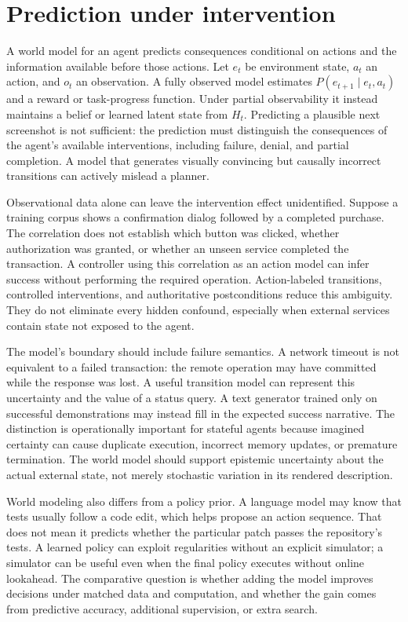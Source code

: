 \section{Prediction under intervention}
\label{sec:C06:intervention}
A world model for an agent predicts consequences conditional on actions and the information available before those actions. Let $e_t$ be environment state, $a_t$ an action, and $o_t$ an observation. A fully observed model estimates $P(e_{t+1}\mid e_t,a_t)$ and a reward or task-progress function. Under partial observability it instead maintains a belief or learned latent state from $H_t$. Predicting a plausible next screenshot is not sufficient: the prediction must distinguish the consequences of the agent's available interventions, including failure, denial, and partial completion. A model that generates visually convincing but causally incorrect transitions can actively mislead a planner.

Observational data alone can leave the intervention effect unidentified. Suppose a training corpus shows a confirmation dialog followed by a completed purchase. The correlation does not establish which button was clicked, whether authorization was granted, or whether an unseen service completed the transaction. A controller using this correlation as an action model can infer success without performing the required operation. Action-labeled transitions, controlled interventions, and authoritative postconditions reduce this ambiguity. They do not eliminate every hidden confound, especially when external services contain state not exposed to the agent.

The model's boundary should include failure semantics. A network timeout is not equivalent to a failed transaction: the remote operation may have committed while the response was lost. A useful transition model can represent this uncertainty and the value of a status query. A text generator trained only on successful demonstrations may instead fill in the expected success narrative. The distinction is operationally important for stateful agents because imagined certainty can cause duplicate execution, incorrect memory updates, or premature termination. The world model should support epistemic uncertainty about the actual external state, not merely stochastic variation in its rendered description.

World modeling also differs from a policy prior. A language model may know that tests usually follow a code edit, which helps propose an action sequence. That does not mean it predicts whether the particular patch passes the repository's tests. A learned policy can exploit regularities without an explicit simulator; a simulator can be useful even when the final policy executes without online lookahead. The comparative question is whether adding the model improves decisions under matched data and computation, and whether the gain comes from predictive accuracy, additional supervision, or extra search.

